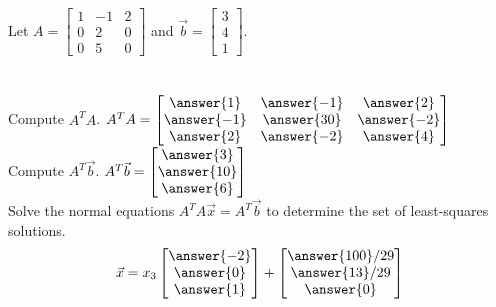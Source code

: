 \documentclass{ximera}
\begin{document}
  	  		                         \begin{question} 
  	  		                      	Let $A = \begin{bmatrix} 1 &-1&2\\0&2&0\\0&5&0\end{bmatrix}$ and $\vec{b}= \begin{bmatrix}3\\4\\1\end{bmatrix}$.\\\\
  	  		                      	\vspace{10pt}\\
  	  		                      	Compute $A^TA$. $A^TA =\begin{bmatrix} \answer{1}& \answer{-1}&\answer{2}\\\answer{-1}& \answer{30}&\answer{-2}\\\answer{2}&\answer{-2}&\answer{4}\end{bmatrix}$\vspace{20pt}\\
  	  		                      	Compute $A^T\vec{b}$. $A^T\vec{b} = \begin{bmatrix} \answer{3}\\\answer{10}\\\answer{6}\end{bmatrix}$\vspace{20pt}\\
  	  		                      	Solve the normal equations $A^TA\vec{x} = A^T\vec{b}$ to determine the set of least-squares solutions.\\
  	  		                      	$$\vec{x} = x_3\begin{bmatrix}\answer{-2}\\ \answer{0}\\\answer{1}\end{bmatrix}+ \begin{bmatrix}\answer{100}/29\\ \answer{13}/29\\\answer{0}\end{bmatrix}$$
  	  		                      	
  	  		                     
  	  		                      	
  	  		                      	
  	  		                      \end{question}
\end{document}
